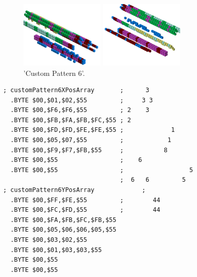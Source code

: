 \begin{minipage}[b]{0.54\linewidth}
\begin{figure}[H]
    \centering
    \begin{adjustbox}{width=6cm,margin=0cm 0cm}
      \includegraphics[width=4cm]{src/patterns/pattern14-45.png}%
    \end{adjustbox}
    \begin{adjustbox}{width=6cm,margin=0cm -1.8cm}
      \includegraphics[width=4cm]{src/patterns/pattern14-225.png}%
    \end{adjustbox}
\caption{'Custom Pattern 6'.}
\end{figure}
\end{minipage}
\begin{minipage}[b]{0.44\linewidth}
\begin{lrbox}{\mybox}%
\begin{lstlisting}[basicstyle=\ttfamily\tiny]
; customPattern6XPosArray       ;      3            
  .BYTE $00,$01,$02,$55         ;     3 3           
  .BYTE $00,$F6,$F6,$55         ; 2    3            
  .BYTE $00,$FB,$FA,$FB,$FC,$55 ; 2                 
  .BYTE $00,$FD,$FD,$FE,$FE,$55 ;             1     
  .BYTE $00,$05,$07,$55         ;            1      
  .BYTE $00,$F9,$F7,$FB,$55     ;           8       
  .BYTE $00,$55                 ;    6              
  .BYTE $00,$55                 ;                  5
                                ;  6   6         5  
; customPattern6YPosArray             ;                   
  .BYTE $00,$FF,$FE,$55         ;        44         
  .BYTE $00,$FC,$FD,$55         ;        44         
  .BYTE $00,$FA,$FB,$FC,$FB,$55
  .BYTE $00,$05,$06,$06,$05,$55
  .BYTE $00,$03,$02,$55
  .BYTE $00,$01,$03,$03,$55
  .BYTE $00,$55
  .BYTE $00,$55
\end{lstlisting}
\end{lrbox}%
\scalebox{0.9}{\usebox{\mybox}}

\end{minipage}
